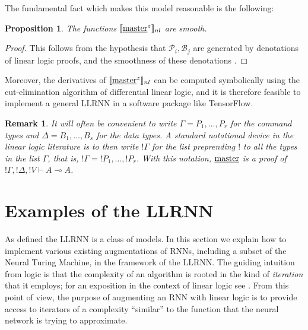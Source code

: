 \documentclass[english,letter paper,12pt,leqno]{article}
\newtheorem{proposition}[theorem]{Proposition}
\theoremstyle{example}
\newtheorem{remark}[theorem]{Remark}
\numberwithin{equation}{section}
\begin{document}
The fundamental fact which makes this model reasonable is the following:

\begin{proposition} The functions $\llbracket \underline{\textup{master}}^z \rrbracket_{nl}$ are smooth.
\end{proposition}
\begin{proof}
This follows from the hypothesis that $\mathscr{P}_i, \mathscr{B}_j$ are generated by denotations of linear logic proofs, and the smoothness of these denotations \cite{murfetclift}.
\end{proof}

Moreover, the derivatives of $\llbracket \underline{\textup{master}}^z \rrbracket_{nl}$ can be computed symbolically using the cut-elimination algorithm of differential linear logic, and it is therefore feasible to implement a general LLRNN in a software package like TensorFlow. 

\begin{remark}\label{remark:sequentbang} It will often be convenient to write $\Gamma = P_1, \ldots, P_r$ for the command types and $\Delta = B_1, \ldots, B_s$ for the data types. A standard notational device in the linear logic literature is to then write ${!} \Gamma$ for the list preprending ${!}$ to all the types in the list $\Gamma$, that is, ${!} \Gamma = {!} P_1, \ldots, {!} P_r$. With this notation, $\underline{\textup{master}}$ is a proof of ${!} \Gamma, {!} \Delta, {!} V \vdash A \multimap A$.
\end{remark}

\section{Examples of the LLRNN}

As defined the LLRNN is a class of models. In this section we explain how to implement various existing augmentations of RNNs, including a subset of the Neural Turing Machine, in the framework of the LLRNN. The guiding intuition from logic is that the complexity of an algorithm is rooted in the kind of \emph{iteration} that it employs; for an exposition in the context of linear logic see \cite[\S 7]{murfet_ll}. From this point of view, the purpose of augmenting an RNN with linear logic is to provide access to iterators of a complexity ``similar'' to the function that the neural network is trying to approximate.
\end{document}
